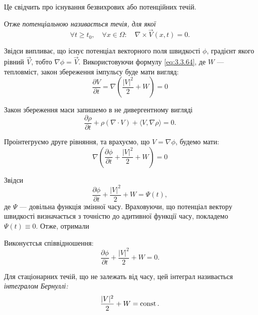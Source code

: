 Це свідчить про існування безвихрових або потенційних течій. \medskip

\begin{definition}
	Отже \it{потенціальною} називається течія, для якої
	\begin{equation}
		\forall t \ge t_0, \quad \forall x \in \Omega: \quad \nabla \times \vec V(x, t) = 0.
	\end{equation}
\end{definition}

Звідси випливає, що існує потенціал векторного поля швидкості $\phi$, градієнт якого рівний $\vec V$, тобто $\nabla \phi = \vec V$. Використовуючи формулу \eqref{eq:3.3.64}, де $W$ --- тепловміст, закон збереження імпульсу буде мати вигляд:
\begin{equation}
	\frac{\partial V}{\partial t} = \nabla \left( \frac{|V|^2}{2} + W \right) = 0
\end{equation}

Закон збереження маси запишемо в не дивергентному вигляді
\begin{equation}
	\frac{\partial \rho}{\partial t} + \rho (\nabla \cdot V) + \langle V, \nabla \rho \rangle = 0.
\end{equation}

Проінтегруємо друге рівняння, та врахуємо, що $V = \nabla \phi$, будемо мати:
\begin{equation}
	\nabla \left( \frac{\partial \phi}{\partial t} + \frac{|V|^2}{2} + W \right) = 0
\end{equation}

Звідси  
\begin{equation}
	\frac{\partial \phi}{\partial t} + \frac{|V|^2}{2} + W = \Psi(t), 
\end{equation}
де $\Psi$ --- довільна функція змінної часу. Враховуючи, що потенціал вектору швидкості визначається з точністю до адитивної функції часу, покладемо $\Psi(t) \equiv 0$. Отже, отримали
\begin{th_equation}
	Виконуєтсья співвідношення:
	\begin{equation}
		\frac{\partial \phi}{\partial t} + \frac{|V|^2}{2} + W = 0.
	\end{equation}
\end{th_equation}

\begin{definition}
	Для стаціонарних течій, що не залежать від часу, цей інтеграл називається \it{інтегралом Бернуллі}:
	\begin{equation}
		\frac{|V|^2}{2} + W = \operatorname{const}.
	\end{equation}
\end{definition}

